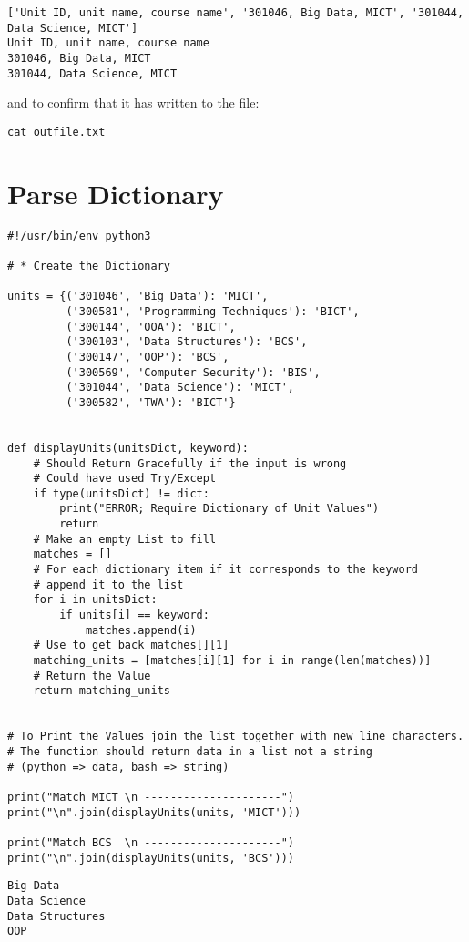 \documentclass[11pt]{article}
\begin{document}
\begin{verbatim}
['Unit ID, unit name, course name', '301046, Big Data, MICT', '301044, Data Science, MICT']
Unit ID, unit name, course name
301046, Big Data, MICT
301044, Data Science, MICT
\end{verbatim}


and to confirm that it has written to the file:

\begin{verbatim}
cat outfile.txt
\end{verbatim}

\section{Parse Dictionary}
\label{sec:org73bad5f}

\begin{verbatim}
#!/usr/bin/env python3

# * Create the Dictionary

units = {('301046', 'Big Data'): 'MICT',
         ('300581', 'Programming Techniques'): 'BICT',
         ('300144', 'OOA'): 'BICT',
         ('300103', 'Data Structures'): 'BCS',
         ('300147', 'OOP'): 'BCS',
         ('300569', 'Computer Security'): 'BIS',
         ('301044', 'Data Science'): 'MICT',
         ('300582', 'TWA'): 'BICT'}


def displayUnits(unitsDict, keyword):
    # Should Return Gracefully if the input is wrong
    # Could have used Try/Except
    if type(unitsDict) != dict:
        print("ERROR; Require Dictionary of Unit Values")
        return
    # Make an empty List to fill
    matches = []
    # For each dictionary item if it corresponds to the keyword
    # append it to the list
    for i in unitsDict:
        if units[i] == keyword:
            matches.append(i)
    # Use to get back matches[][1]
    matching_units = [matches[i][1] for i in range(len(matches))]
    # Return the Value
    return matching_units


# To Print the Values join the list together with new line characters.
# The function should return data in a list not a string
# (python => data, bash => string)

print("Match MICT \n ---------------------")
print("\n".join(displayUnits(units, 'MICT')))

print("Match BCS  \n ---------------------")
print("\n".join(displayUnits(units, 'BCS')))
\end{verbatim}

\begin{verbatim}
Big Data
Data Science
Data Structures
OOP
\end{verbatim}
\end{document}
